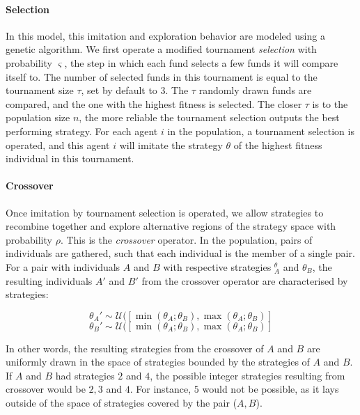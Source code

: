 \documentclass{article}
\begin{document}
\paragraph{Selection} In this model, this imitation and exploration behavior are modeled using a genetic algorithm. We first operate a modified tournament \textit{selection} with probability $\varsigma$, the step in which each fund selects a few funds it will compare itself to. The number of selected funds in this tournament is equal to the tournament size $\tau$, set by default to 3. The $\tau$ randomly drawn funds are compared, and the one with the highest fitness is selected. The closer $\tau$ is to the population size $n$, the more reliable the tournament selection outputs the best performing strategy. For each agent $i$ in the population, a tournament selection is operated, and this agent $i$ will imitate the strategy $\theta$ of the highest fitness individual in this tournament.\\

\paragraph{Crossover} Once imitation by tournament selection is operated, we allow strategies to recombine together and explore alternative regions of the strategy space with probability $\rho$. This is the \textit{crossover} operator. In the population, pairs of individuals are gathered, such that each individual is the member of a single pair. For a pair with individuals $A$ and $B$ with respective strategies $^\theta_A$ and $\theta_B$, the resulting individuals $A'$ and $B'$ from the crossover operator are characterised by strategies:

\begin{equation}
    \theta_A' \sim \mathcal{U}([\min(\theta_A; \theta_B), \max(\theta_A; \theta_B)] 
\end{equation}
\begin{equation}
    \theta_B' \sim \mathcal{U}([\min(\theta_A; \theta_B), \max(\theta_A; \theta_B)] 
\end{equation}

In other words, the resulting strategies from the crossover of $A$ and $B$ are uniformly drawn in the space of strategies bounded by the strategies of $A$ and $B$. If $A$ and $B$ had strategies $2$ and $4$, the possible integer strategies resulting from crossover would be $2, 3$ and $4$. For instance, $5$ would not be possible, as it lays outside of the space of strategies covered by the pair ($A,B$).\\
\end{document}
